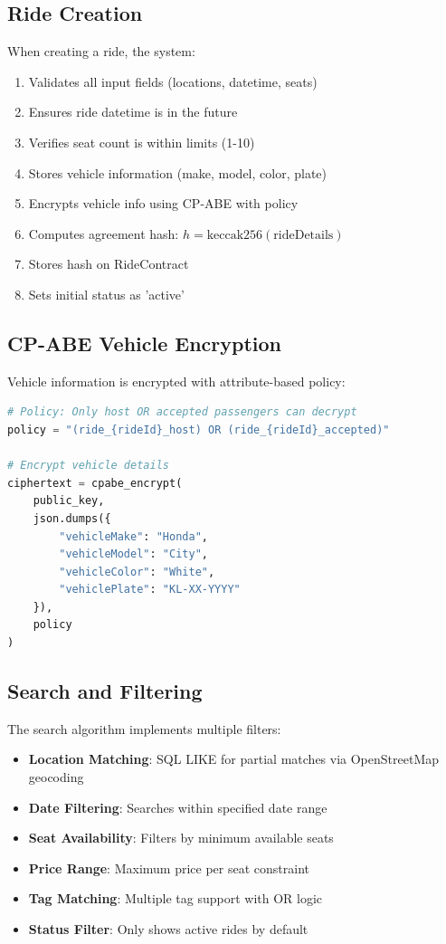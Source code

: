 \documentclass[12pt]{report}
\theoremstyle{plain}
\theoremstyle{definition}
\theoremstyle{remark}
\begin{document}
\subsection{Ride Creation}

When creating a ride, the system:

\begin{enumerate}
    \item Validates all input fields (locations, datetime, seats)
    \item Ensures ride datetime is in the future
    \item Verifies seat count is within limits (1-10)
    \item Stores vehicle information (make, model, color, plate)
    \item Encrypts vehicle info using CP-ABE with policy
    \item Computes agreement hash: $h = \text{keccak256}(\text{rideDetails})$
    \item Stores hash on RideContract
    \item Sets initial status as 'active'
\end{enumerate}

\subsection{CP-ABE Vehicle Encryption}

Vehicle information is encrypted with attribute-based policy:

\begin{lstlisting}[language=Python, caption=CP-ABE Encryption Policy]
# Policy: Only host OR accepted passengers can decrypt
policy = "(ride_{rideId}_host) OR (ride_{rideId}_accepted)"

# Encrypt vehicle details
ciphertext = cpabe_encrypt(
    public_key,
    json.dumps({
        "vehicleMake": "Honda",
        "vehicleModel": "City",
        "vehicleColor": "White",
        "vehiclePlate": "KL-XX-YYYY"
    }),
    policy
)
\end{lstlisting}

\subsection{Search and Filtering}

The search algorithm implements multiple filters:

\begin{itemize}
    \item \textbf{Location Matching}: SQL LIKE for partial matches via OpenStreetMap geocoding
    \item \textbf{Date Filtering}: Searches within specified date range
    \item \textbf{Seat Availability}: Filters by minimum available seats
    \item \textbf{Price Range}: Maximum price per seat constraint
    \item \textbf{Tag Matching}: Multiple tag support with OR logic
    \item \textbf{Status Filter}: Only shows active rides by default
\end{itemize}
\end{document}
